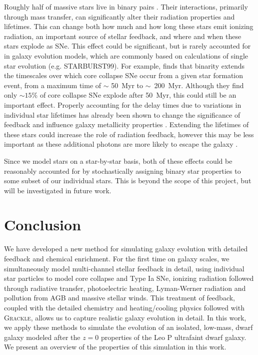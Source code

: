 \documentclass[fleqn,usenatbib,useAMS]{mnras}
\begin{document}
Roughly half of massive stars live in binary pairs \citep{Sana2013}. Their interactions, primarily through mass transfer, can significantly alter their radiation properties and lifetimes. This can change both how much and how long these stars emit ionizing radiation, an important source of stellar feedback, and where and when these stars explode as SNe. This effect could be significant, but is rarely accounted for in galaxy evolution models, which are commonly based on calculations of single star evolution (e.g. STARBURST99). For example, \citet{Zapartas2017} finds that binarity extends the timescales over which core collapse SNe occur from a given star formation event, from a maximum time of $\sim$ 50~Myr to $\sim$~200~Myr. Although they find only $\sim 15\%$ of core collapse SNe explode after 50~Myr, this could still be an important effect. Properly accounting for the delay times due to variations in individual star lifetimes has already been shown to change the significance of feedback and influence galaxy metallicity properties \citep{Kimm2015}. Extending the lifetimes of these stars could increase the role of radiation feedback, however this may be less important as these additional photons are more likely to escape the galaxy \citep[e.g.][]{Ma2016-binary}. 

Since we model stars on a star-by-star basis, both of these effects could be reasonably accounted for by stochastically assigning binary star properties to some subset of our individual stars. This is beyond the scope of this project, but will be investigated in future work.

\section{Conclusion}
\label{sec:conclusion}
We have developed a new method for simulating galaxy evolution with detailed feedback and chemical enrichment. For the first time on galaxy scales, we simultaneously model multi-channel stellar feedback in detail, using individual star particles to model core collapse and Type Ia SNe, ionizing radiation followed through radiative transfer, photoelectric heating, Lyman-Werner radiation and pollution from AGB and massive stellar winds. This treatment of feedback, coupled with the detailed chemistry and heating/cooling physics followed with \textsc{Grackle}, allows us to capture realistic galaxy evolution in detail. In this work, we apply these methods to simulate the evolution of an isolated, low-mass, dwarf galaxy modeled after the $z=0$ properties of the Leo P ultrafaint dwarf galaxy. We present an overview of the properties of this simulation 
in this work.
\end{document}
